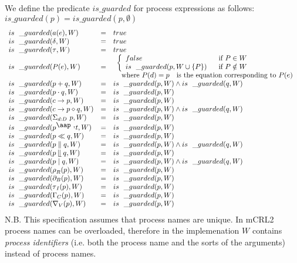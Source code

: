 \documentclass{article}
\begin{document}
We define the predicate $is\_guarded$ for process expressions as follows: $%
is\_guarded(p)=is\_guarded(p,\emptyset )$%
\[
\begin{array}{lll}
is\_guarded(a(e),W) & = & true \\ 
is\_guarded(\delta ,W) & = & true \\ 
is\_guarded(\tau ,W) & = & true \\ 
is\_guarded(P(e),W) & = & 
\begin{array}{l}
\left\{ 
\begin{array}{ll}
false & \text{if }P\in W \\ 
is\_guarded(p,W\cup \{P\}) & \text{if }P\notin W%
\end{array}%
\right. \\ 
\text{where }P(d)=p\text{ is the equation corresponding to }P(e)%
\end{array}
\\ 
is\_guarded(p+q,W) & = & is\_guarded(p,W)\wedge is\_guarded(q,W) \\ 
is\_guarded(p\cdot q,W) & = & is\_guarded(p,W) \\ 
is\_guarded(c\rightarrow p,W) & = & is\_guarded(p,W) \\ 
is\_guarded(c\rightarrow p\diamond q,W) & = & is\_guarded(p,W)\wedge
is\_guarded(q,W) \\ 
is\_guarded(\Sigma _{d:D}\ p,W) & = & is\_guarded(p,W) \\ 
is\_guarded(p^{\mathbin{\mbox{\aap ,}}}t,W) & = & is\_guarded(p,W) \\ 
is\_guarded(p\ll q,W) & = & is\_guarded(p,W) \\ 
is\_guarded(p\parallel q,W) & = & is\_guarded(p,W)\wedge is\_guarded(q,W) \\ 
is\_guarded(p\mathbin{\mathrel{\llfloor}}q,W) & = & is\_guarded(p,W) \\ 
is\_guarded(p\mid q,W) & = & is\_guarded(p,W)\wedge is\_guarded(q,W) \\ 
is\_guarded(\rho _{R}(p),W) & = & is\_guarded(p,W) \\ 
is\_guarded(\partial _{B}(p),W) & = & is\_guarded(p,W) \\ 
is\_guarded(\tau _{I}(p),W) & = & is\_guarded(p,W) \\ 
is\_guarded(\Gamma _{C}(p),W) & = & is\_guarded(p,W) \\ 
is\_guarded(\nabla _{V}(p),W) & = & is\_guarded(p,W)%
\end{array}%
\]%
\newline
N.B. This specification assumes that process names are unique. In mCRL2
process names can be overloaded, therefore in the implemenation $W$ contains 
\emph{process identifiers} (i.e. both the process name and the sorts of the
arguments) instead of process names.
\end{document}
